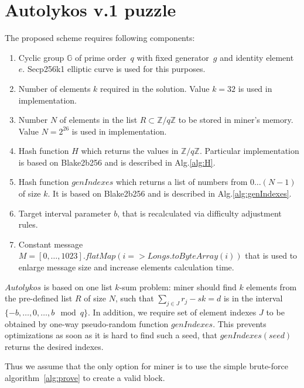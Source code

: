 \documentclass[]{article}
\newcommand{\Name}{$Autolykos$}
\begin{document}
    \section{Autolykos v.1 puzzle}
    \label{puzzle}

    The proposed scheme requires following components:
    \begin{enumerate}
        \item Cyclic group $\mathbb{G}$ of prime order~$q$ with fixed generator~$g$
        and identity element~$e$.
        Secp256k1 elliptic curve is used for this purposes.
        \item Number of elements $k$ required in the solution. Value $k=32$ is used in
        implementation.
        \item Number $N$ of elements in the list
        $R\subset\mathbb{Z}/q\mathbb{Z}$ to be stored in miner's memory.
        Value $N=2^{26}$ is used in implementation.
        \item Hash function $H$ which returns the values in $\mathbb{Z}/q\mathbb{Z}$.
        Particular implementation is based on Blake2b256 and is described in Alg.\ref{alg:H}.
        \item Hash function $genIndexes$ which returns a list of numbers from
        $0\dots(N-1)$ of size $k$.
        It is based on Blake2b256 and is described in Alg.\ref{alg:genIndexes}.
        \item Target interval parameter $b$, that is recalculated via difficulty adjustment rules.
        \item Constant message $M=[0,\dots,1023].flatMap(i => Longs.toByteArray(i))$ that is used to enlarge message size and increase elements calculation time.
    \end{enumerate}

    \Name{} is based on one list $k$-sum problem: miner should find
    $k$ elements from the pre-defined list $R$ of size $N$, such that
    $\sum_{j \in J} r_{j} - sk = d$ is in the interval $\{-b,\dots,0,\dots,b\mod q\}$.
    In addition, we require set of element indexes $J$ to be obtained
    by one-way pseudo-random function $genIndexes$. This prevents optimizations as
    soon as it is hard to find such a seed,
    that $genIndexes(seed)$ returns the desired indexes.

    Thus we assume that the only option for miner is to use the simple brute-force algorithm~\ref{alg:prove} to
    create a valid block.
\end{document}
